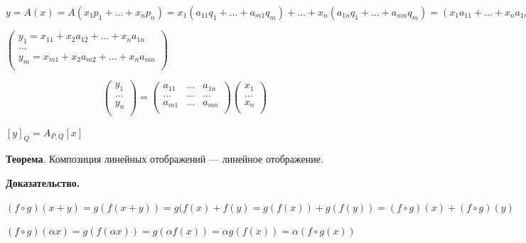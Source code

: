 \documentclass[a4paper]{article}
\begin{document}
    $y = A(x) = A(x_1p_1 + ... + x_np_n) = x_1(a_{11}q_1 + ... + a_{m1}q_m) + ... + x_n(a_{1n}q_1 + ... + a_{mn}q_m) = (x_1a_{11} + ... + x_na_{1n})q_1 + ... + (x_1a_{21} + ... + x_na_{2n}) + ...$

    $\displaystyle \begin{pmatrix}
                       y_1 = x_{11} + x_2a_{12} + ... + x_na_{1n} \\
                       ...                                        \\
                       y_m = x_{m1} + x_2a_{m2} + ... + x_na_{mn} \\
    \end{pmatrix}$

    \begin{equation}
        \displaystyle \begin{pmatrix}
                          y_1 \\
                          ... \\
                          y_n \\
        \end{pmatrix} = \begin{pmatrix}
                            a_{11} & ... & a_{1n} \\
                            ...    & ... & ...    \\
                            a_{m1} & ... & a_{mn} \\
        \end{pmatrix} \begin{pmatrix}
                          x_1 \\
                          ... \\
                          x_n \\
        \end{pmatrix}
    \end{equation}

    $\left[y \right]_Q = A_{P,Q} \left[ x \right]$

    \begin{htheorem}
        \textbf{Теорема}. Композиция линейных отображений --- линейное отображение.
    \end{htheorem}

    \begin{hproof}
        \textbf{Доказательство.}

        $(f \circ g)(x+y) = g(f(x+y)) = g(f(x) + f(y) = g(f(x)) + g(f(y)) = (f \circ g)(x) + (f \circ g)(y)$

        $(f \circ g)(\alpha x) = g(f(\alpha x)) = g(\alpha f(x)) = \alpha g(f(x)) = \alpha (f \circ g(x))$
    \end{hproof}
\end{document}
